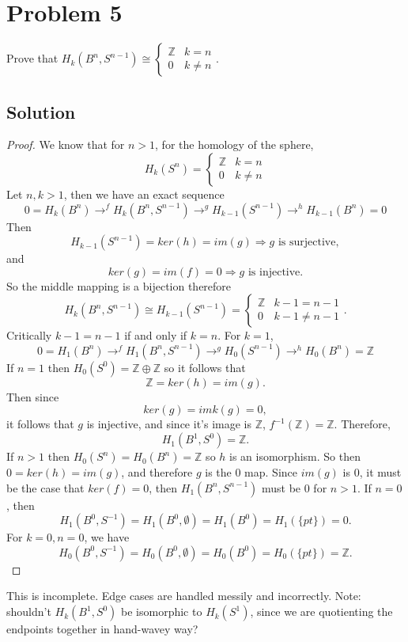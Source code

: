\documentclass{article}
\theoremstyle{definition}
\begin{document}
\section*{Problem 5}
Prove that $H_k(B^n,S^{n-1}) \cong \left\{\begin{array}{rl} \mathbb{Z} &k=n\\0&k\neq n\end{array}\right.$.
\\ \hline
    \subsection*{Solution}

    \begin{proof}
    We know that for $n > 1$, for the homology of the sphere,
    \[
        H_k(S^n) = \begin{cases}
            \mathbb{Z} & k = n \\
            0 & k \neq n
        \end{cases} 
    \] 
    Let $n,k > 1$, then we have an exact sequence 
    \[
    0 = H_k(B^n) \rightarrow^f H_k(B^n, S^{n-1}) \rightarrow^g H_{k-1}(S^{n-1}) \rightarrow^h H_{k-1}(B^n) = 0
    \] 
    Then 
    \[
    H_{k-1}(S^{n-1}) = ker(h) = im(g) \Rightarrow g \text{ is surjective}
    ,\]
    and
    \[
    ker(g) = im(f) = 0 \Rightarrow g \text{ is injective}
    .\] 
    So the middle mapping is a bijection therefore 
    \[
    H_k(B^n, S^{n-1}) \cong H_{k-1}(S^{n-1}) = \begin{cases}
        \mathbb{Z} & k-1 = n-1 \\
        0 & k-1 \neq n-1
    \end{cases}
    .\] 
    Critically $k-1=n-1$ if and only if $k=n$.
    For $k=1$,
    \[
    0 = H_1(B^n) \to^f H_1(B^n, S^{n-1}) \to^g H_0(S^{n-1}) \to^h H_0(B^n) = \mathbb{Z}
    \] 
    If $n = 1$ then $H_0(S^{0}) = \mathbb{Z} \oplus \mathbb{Z}$ so it follows that 
    \[
    \mathbb{Z} = ker(h) = im(g)
    .\] 
    Then since 
    \[
    ker(g) = imk(g) = 0
    ,\] 
    it follows that $g$ is injective, and since it's image is $\mathbb{Z}$, $f^{-1}(\mathbb{Z}) = \mathbb{Z}$.
    Therefore,
    \[
    H_1(B^1, S^0) = \mathbb{Z}
    .\] 
    If $n > 1$ then $H_0(S^n) = H_0(B^n) = \mathbb{Z}$ so $h$ is an isomorphism.
    So then $0 = ker(h) = im(g)$, and therefore $g$ is the 0 map.
    Since $im(g)$ is 0, it must be the case that $ker(f) = 0$, then $H_1(B^n, S^{n-1})$ must be 0 for $n > 1$.
    If $n=0$, then
    \[
    H_1(B^0, S^{-1}) = H_1(B^0, \emptyset) = H_1(B^0) = H_1(\{pt\}) = 0
    .\] 
    For $k=0, n = 0$, we have 
    \[
    H_0(B^0, S^{-1}) = H_0(B^0, \emptyset) = H_0(B^0) = H_0(\{pt\}) = \mathbb{Z}
    .\] 
    \end{proof}
    This is incomplete. Edge cases are handled messily and incorrectly.
    Note: shouldn't $H_k(B^1, S^0)$ be isomorphic to $H_k(S^1)$, since we are quotienting 
    the endpoints together in hand-wavey way?
\pagebreak
\end{document}
